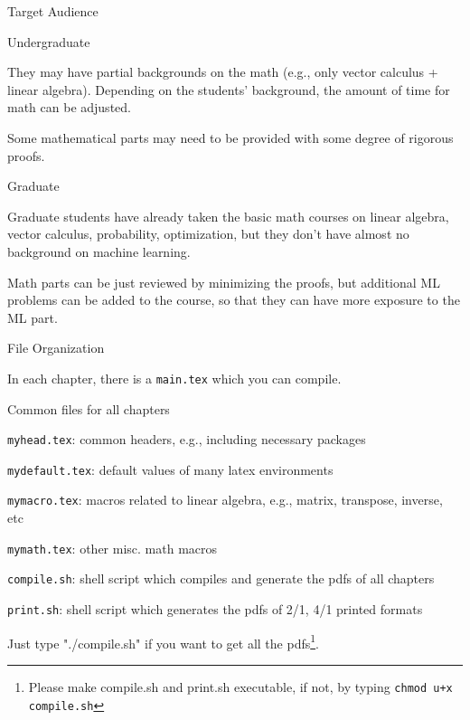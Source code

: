 \documentclass[handout,fleqn,aspectratio=169]{beamer}
\begin{document}
\begin{frame}{Target Audience}

\plitemsep 0.1in

\bci 

\item Undergraduate
\bci 
\item They may have partial backgrounds on the math (e.g., only vector calculus + linear algebra). Depending on the students' background, the amount of time for math can be adjusted. 

\item Some mathematical parts may need to be provided with some degree of rigorous proofs. 
\eci 

\item Graduate
\bci
\item Graduate students have already taken the basic math courses on linear algebra, vector calculus, probability, optimization, but they don't have almost no background on machine learning.
\item Math parts can be just reviewed by minimizing the proofs, but additional ML problems can be added to the course, so that they can have more exposure to the ML part. 
\eci
\eci
\end{frame}



\begin{frame}{File Organization}

\plitemsep 0.1in

\bci 

\item In each chapter, there is a {\tt main.tex} which you can compile.

\item Common files for all chapters
\bci
\item {\tt myhead.tex}: common headers, e.g., including necessary packages
\item {\tt mydefault.tex}: default values of many latex environments
\item {\tt mymacro.tex}: macros related to linear algebra, e.g., matrix, transpose, inverse, etc
\item {\tt mymath.tex}: other misc. math macros
\item {\tt compile.sh}: shell script which compiles and generate the pdfs of all chapters
\item {\tt print.sh}: shell script which generates the pdfs of 2/1, 4/1 printed formats
\eci

\item Just type "./compile.sh" if you want to get all the pdfs\footnote{Please make compile.sh and print.sh executable, if not, by typing {\tt chmod u+x compile.sh}}. 
\eci
\end{frame}
\end{document}
